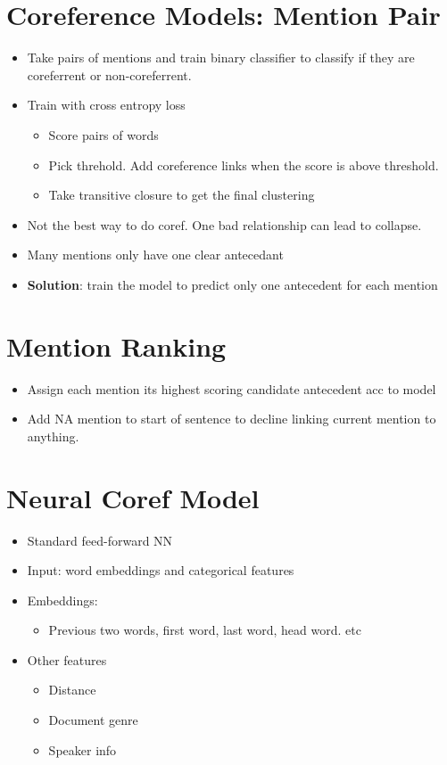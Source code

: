 \documentclass[a4paper]{article}
\begin{document}
\section{Coreference Models: Mention Pair}
\begin{itemize}
    \item Take pairs of mentions and train binary classifier to classify if they are coreferrent or non-coreferrent.
    \item Train with cross entropy loss
    \begin{itemize}
        \item Score pairs of words
        \item Pick threhold. Add coreference links when the score is above threshold.
        \item Take transitive closure to get the final clustering
    \end{itemize}
    \item Not the best way to do coref. One bad relationship can lead to collapse.
    \item Many mentions only have one clear antecedant
    \item \textbf{Solution}: train the model to predict only one antecedent for each mention 
\end{itemize}
\section{Mention Ranking}
\begin{itemize}
    \item Assign each mention its highest scoring candidate antecedent acc to model
    \item Add NA mention to start of sentence to decline linking current mention to anything.
\end{itemize}
\section{Neural Coref Model}
\begin{itemize}
    \item Standard feed-forward NN
    \item Input: word embeddings and categorical features
    \item Embeddings:
    \begin{itemize}
        \item Previous two words, first word, last word, head word. etc
    \end{itemize}
    \item Other features
    \begin{itemize}
        \item Distance
        \item Document genre
        \item Speaker info
    \end{itemize}
\end{itemize}
\end{document}
